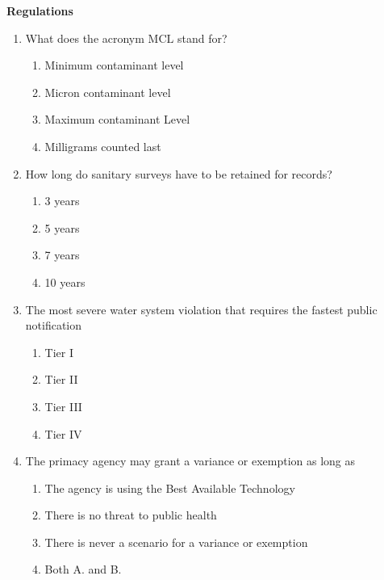 \documentclass{article}
\begin{document}
\newpage
\textbf{Regulations}
\begin{enumerate}
\item  What does the acronym $\mathrm{MCL}$ stand for?\\
\begin{enumerate}
\item Minimum contaminant level\\
\item Micron contaminant level\\
\item Maximum contaminant Level\\
\item Milligrams counted last
\end{enumerate}

\item  How long do sanitary surveys have to be retained for records?\\
\begin{enumerate}
\item 3 years\\
\item 5 years\\
\item 7 years\\
\item 10 years
\end{enumerate}

\item The most severe water system violation that requires the fastest public notification\\
\begin{enumerate}
\item Tier I\\
\item Tier II\\
\item Tier III\\
\item Tier IV
\end{enumerate}

\item  The primacy agency may grant a variance or exemption as long as\\
\begin{enumerate}
\item The agency is using the Best Available Technology\\
\item There is no threat to public health\\
\item There is never a scenario for a variance or exemption\\
\item Both A. and B.
\end{enumerate}


\end{enumerate}
\end{document}
